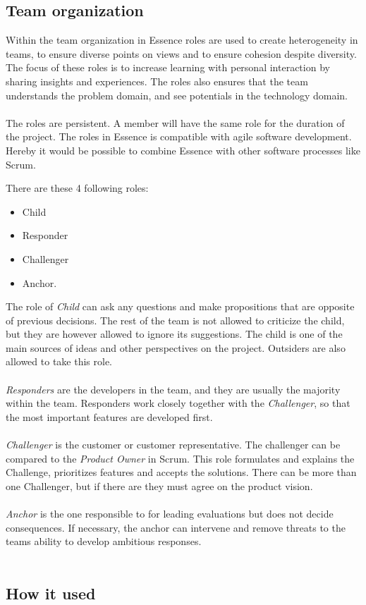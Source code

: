 \subsection{Team organization}
Within the team organization in Essence roles are used to create heterogeneity in teams, to ensure diverse points on views and to ensure cohesion despite diversity.
The focus of these roles is to increase learning with personal interaction by sharing insights and experiences.
The roles also ensures that the team understands the problem domain, and see potentials in the technology domain.
\\\\
The roles are persistent. 
A member will have the same role for the duration of the project.
The roles in Essence is compatible with agile software development. 
Hereby it would be possible to combine Essence with other software processes like Scrum.

There are these 4 following roles:
\begin{itemize}
    \item Child
    \item Responder
    \item Challenger
    \item Anchor.
\end{itemize}
The role of \textit{Child} can ask any questions and make propositions that are opposite of previous decisions.
The rest of the team is not allowed to criticize the child, but they are however allowed to ignore its suggestions.
The child is one of the main sources of ideas and other perspectives on the project.
Outsiders are also allowed to take this role.
\\\\
\textit{Responders} are the developers in the team, and they are usually the majority within the team.
Responders work closely together with the \textit{Challenger}, so that the most important features are developed first.
\\\\
\textit{Challenger} is the customer or customer representative. 
The challenger can be compared to the \textit{Product Owner} in Scrum.
This role formulates and explains the Challenge, prioritizes features and accepts the solutions.
There can be more than one Challenger, but if there are they must agree on the product vision.
\\\\
\textit{Anchor} is the one responsible to for leading evaluations but does not decide consequences.
If necessary, the anchor can intervene and remove threats to the teams ability to develop ambitious responses. 
\\\\
\subsection{How it used}
